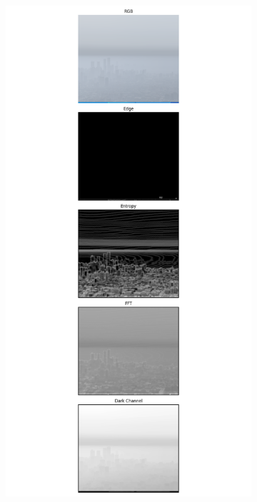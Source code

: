 \begin{figure}
\begin{subfigure}[b]{0.15\textwidth}
    \label{subfig:bin1}
    \caption{}
  \end{subfigure}
    \begin{subfigure}[b]{0.15\textwidth}
      \includegraphics[width=\textwidth, trim={7.5cm 0 7.5cm 0},clip]{imgs/examples/exp_0_featuresMiles_1.8951868467819106_featuresM_3050_features.png}

\end{subfigure}
\end{figure}
